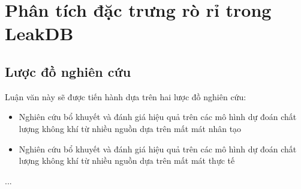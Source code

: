 \chapter{Phân tích đặc trưng rò rỉ trong LeakDB}
\section{Lược đồ nghiên cứu}

Luận văn này sẽ được tiến hành dựa trên hai lược đồ nghiên cứu:
\begin{itemize}
    \item Nghiên cứu bổ khuyết và đánh giá hiệu quả trên các mô hình dự đoán chất lượng không khí từ nhiều nguồn dựa trên mất mát nhân tạo
    \item Nghiên cứu bổ khuyết và đánh giá hiệu quả trên các mô hình dự đoán chất lượng không khí từ nhiều nguồn dựa trên mất mát thực tế
\end{itemize}


...

